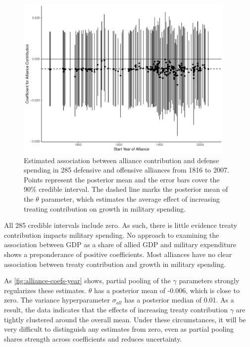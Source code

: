 \documentclass[12pt]{article}
\begin{document}
\begin{figure}[htbp]
	\centering
		\includegraphics[width=0.95\textwidth]{alliance-coefs-year.pdf}
	\caption{Estimated association between alliance contribution and defense spending in 285 defensive and offensive alliances from 1816 to 2007. Points represent the posterior mean and the error bars cover the 90\% credible interval. The dashed line marks the posterior mean of the $\theta$ parameter, which estimates the average effect of increasing treating contribution on growth in military spending.}
	\label{fig:alliance-coefs-year}
\end{figure}


All 285 credible intervals include zero. 
As such, there is little evidence treaty contribution impacts military spending. 
No approach to examining the association between GDP as a share of allied GDP and military expenditure shows a preponderance of positive coefficients. 
Most alliances have no clear association between treaty contribution and growth in military spending.


As \autoref{fig:alliance-coefs-year} shows, partial pooling of the $\gamma$ parameters strongly regularizes these estimates. 
$\theta$ has a posterior mean of -0.006, which is close to zero. 
The variance hyperparameter $\sigma_{all}$ has a posterior median of 0.01. 
As a result, the data indicates that the effects of increasing treaty contribution $\gamma$ are tightly clustered around the overall mean. 
Under these circumstances, it will be very difficult to distinguish any estimates from zero, even as partial pooling shares strength across coefficients and reduces uncertainty. 
\end{document}
